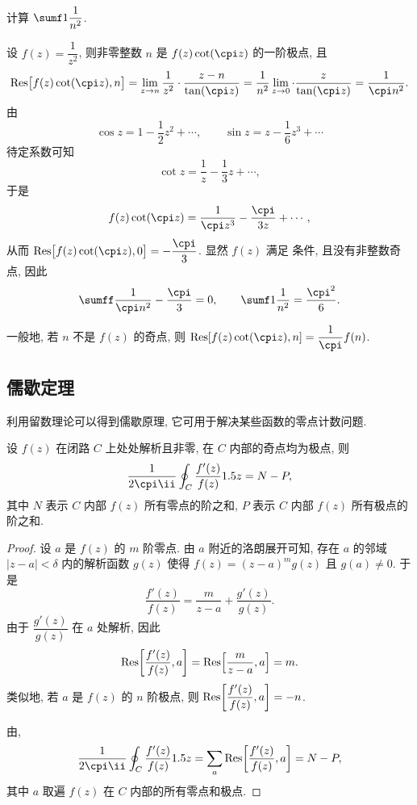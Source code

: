 \begin{example}\label{exam:bessel-question}
  计算 $\sumf1 \dfrac1{n^2}$.
\end{example}

\begin{solution}
  设 $f(z)=\dfrac1{z^2}$, 则非零整数 $n$ 是 $f(z)\cot(\cpi z)$ 的一阶极点, 且
  \[
     \Res\bigl[f(z)\cot(\cpi z),n\bigr]
    =\lim_{z\ra n}\frac1{z^2}\cdot\frac{z-n}{\tan(\cpi z)}
    =\frac1{n^2}\lim_{z\ra 0}\cdot\frac{z}{\tan(\cpi z)}
    =\frac1{\cpi n^2}.
  \]
  由
  \[
    \cos z=1-\dfrac12z^2+\cdots,\qquad
    \sin z=z-\dfrac16z^3+\cdots
  \]
  待定系数可知
  \[
     \cot z=\frac1z-\frac13z+\cdots,
  \]
  于是
  \[
     f(z)\cot(\cpi z)
    =\frac1{\cpi z^3}-\frac{\cpi}{3z}+\cdots,
  \]
  从而 $\Res\bigl[f(z)\cot(\cpi z),0\bigr]=-\dfrac\cpi3$.
  显然 $f(z)$ 满足 条件, 且没有非整数奇点, 因此
  \[
    \sumff \frac1{\cpi n^2}-\frac\cpi3=0,\qquad
    \sumf1 \frac1{n^2}=\frac{\cpi^2}6.
  \]
\end{solution}

一般地, 若 $n$ 不是 $f(z)$ 的奇点, 则 $\Res[f(z)\cot(\cpi z),n]=\dfrac1\cpi f(n)$.


\subsection{儒歇定理\optional}

利用留数理论可以得到儒歇原理, 它可用于解决某些函数的零点计数问题.

\begin{theorem}
  \label{thm:log-f-derivative-sum-order}
  设 $f(z)$ 在闭路 $C$ 上处处解析且非零, 在 $C$ 内部的奇点均为极点, 则
  \[
    \frac1{2\cpi\ii}\oint_C \frac{f'(z)}{f(z)}\d z
    =N-P,
  \]
  其中 $N$ 表示 $C$ 内部 $f(z)$ 所有零点的阶之和, $P$ 表示 $C$ 内部 $f(z)$ 所有极点的阶之和.
\end{theorem}

\begin{proof}
  设 $a$ 是 $f(z)$ 的 $m$ 阶零点.
  由 $a$ 附近的洛朗展开可知, 存在 $a$ 的邻域 $|z-a|<\delta$ 内的解析函数 $g(z)$ 使得 $f(z)=(z-a)^mg(z)$ 且 $g(a)\neq 0$.
  于是
  \[
    \frac{f'(z)}{f(z)}=\frac m{z-a}+\frac{g'(z)}{g(z)}.
  \]
  由于 $\dfrac{g'(z)}{g(z)}$ 在 $a$ 处解析, 因此
  \[
     {\mathrm{Res}}\biggl[\frac{f'(z)}{f(z)},a\biggr]
    ={\mathrm{Res}}\Bigl[\frac m{z-a},a\Bigr]
    =m.
  \]
  类似地, 若 $a$ 是 $f(z)$ 的 $n$ 阶极点, 则 ${\mathrm{Res}}\biggl[\dfrac{f'(z)}{f(z)},a\biggr]=-n$.

  由\thmRes,
  \[
     \frac1{2\cpi\ii}\oint_C \frac{f'(z)}{f(z)}\d z
    =\sum_a\Res\biggl[\frac{f'(z)}{f(z)},a\biggr]=N-P,
  \]
  其中 $a$ 取遍 $f(z)$ 在 $C$ 内部的所有零点和极点.
\end{proof}

